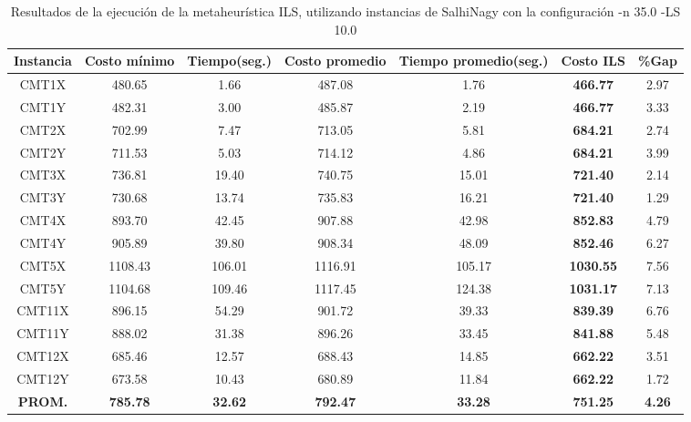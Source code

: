 \begin{table}[ht]
\caption{Resultados de la ejecución de la metaheurística ILS, utilizando instancias de SalhiNagy con la configuración -n 35.0 -LS 10.0}
\centering
\small
\begin{tabular}{c c c c c c c}
\hline\hline
Instancia & Costo mínimo & Tiempo(seg.) & Costo promedio & Tiempo promedio(seg.) & Costo ILS & \%Gap \\ [0.5ex]
\hline
CMT1X & 480.65 & 1.66 & 
487.08 & 1.76 & \bf{466.77} & 
2.97\\CMT1Y & 482.31 & 3.00 & 
485.87 & 2.19 & \bf{466.77} & 
3.33\\CMT2X & 702.99 & 7.47 & 
713.05 & 5.81 & \bf{684.21} & 
2.74\\CMT2Y & 711.53 & 5.03 & 
714.12 & 4.86 & \bf{684.21} & 
3.99\\CMT3X & 736.81 & 19.40 & 
740.75 & 15.01 & \bf{721.40} & 
2.14\\CMT3Y & 730.68 & 13.74 & 
735.83 & 16.21 & \bf{721.40} & 
1.29\\CMT4X & 893.70 & 42.45 & 
907.88 & 42.98 & \bf{852.83} & 
4.79\\CMT4Y & 905.89 & 39.80 & 
908.34 & 48.09 & \bf{852.46} & 
6.27\\CMT5X & 1108.43 & 106.01 & 
1116.91 & 105.17 & \bf{1030.55} & 
7.56\\CMT5Y & 1104.68 & 109.46 & 
1117.45 & 124.38 & \bf{1031.17} & 
7.13\\CMT11X & 896.15 & 54.29 & 
901.72 & 39.33 & \bf{839.39} & 
6.76\\CMT11Y & 888.02 & 31.38 & 
896.26 & 33.45 & \bf{841.88} & 
5.48\\CMT12X & 685.46 & 12.57 & 
688.43 & 14.85 & \bf{662.22} & 
3.51\\CMT12Y & 673.58 & 10.43 & 
680.89 & 11.84 & \bf{662.22} & 
1.72\\\bf{PROM.} & 
\bf{785.78} & \bf{32.62} & \bf{792.47} & \bf{33.28} & \bf{751.25} & \bf{4.26}\\[1ex]\hline
\end{tabular}
\label{table:nonlin}
\end{table} \clearpage
